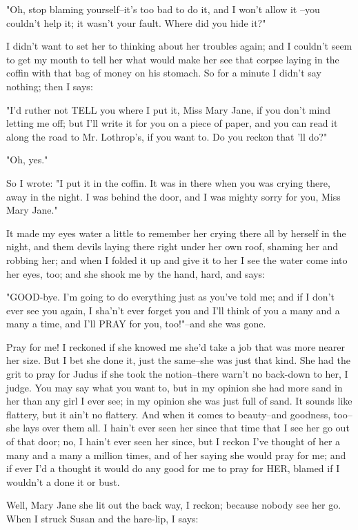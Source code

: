 "Oh, stop blaming yourself--it's too bad to do it, and I won't allow it
--you couldn't help it; it wasn't your fault.  Where did you hide it?"

I didn't want to set her to thinking about her troubles again; and I
couldn't seem to get my mouth to tell her what would make her see that
corpse laying in the coffin with that bag of money on his stomach.  So
for a minute I didn't say nothing; then I says:

"I'd ruther not TELL you where I put it, Miss Mary Jane, if you don't
mind letting me off; but I'll write it for you on a piece of paper, and
you can read it along the road to Mr. Lothrop's, if you want to.  Do you
reckon that 'll do?"

"Oh, yes."

So I wrote:  "I put it in the coffin.  It was in there when you was
crying there, away in the night.  I was behind the door, and I was mighty
sorry for you, Miss Mary Jane."

It made my eyes water a little to remember her crying there all by
herself in the night, and them devils laying there right under her own
roof, shaming her and robbing her; and when I folded it up and give it to
her I see the water come into her eyes, too; and she shook me by the
hand, hard, and says:

"GOOD-bye.  I'm going to do everything just as you've told me; and if I
don't ever see you again, I sha'n't ever forget you and I'll think of
you a many and a many a time, and I'll PRAY for you, too!"--and she was
gone.

Pray for me!  I reckoned if she knowed me she'd take a job that was more
nearer her size.  But I bet she done it, just the same--she was just that
kind.  She had the grit to pray for Judus if she took the notion--there
warn't no back-down to her, I judge.  You may say what you want to, but
in my opinion she had more sand in her than any girl I ever see; in my
opinion she was just full of sand.  It sounds like flattery, but it ain't
no flattery.  And when it comes to beauty--and goodness, too--she lays
over them all.  I hain't ever seen her since that time that I see her go
out of that door; no, I hain't ever seen her since, but I reckon I've
thought of her a many and a many a million times, and of her saying she
would pray for me; and if ever I'd a thought it would do any good for me
to pray for HER, blamed if I wouldn't a done it or bust.

Well, Mary Jane she lit out the back way, I reckon; because nobody see
her go.  When I struck Susan and the hare-lip, I says:

